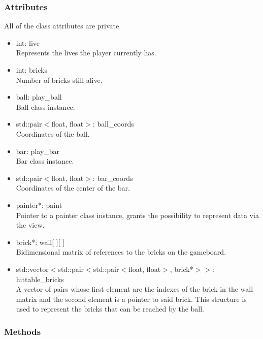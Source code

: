 \documentclass[]{article}
\begin{document}
\subsubsection{Attributes}
All of the class attributes are private
	\begin{itemize}
		\item int: live \\Represents the lives the player currently has.
		\item int: bricks \\Number of bricks still alive.
		\item ball: play\_ball \\Ball class instance.
		\item std::pair$<$float, float$>$: ball\_coords\\Coordinates of the ball.
		\item bar: play\_bar\\Bar class instance.
		\item std::pair$<$float, float$>$: bar\_coords\\Coordinates of the center of the bar.
		\item painter*: paint \\ Pointer to a painter class instance, grants the possibility to represent data via the view.
		\item brick*: wall[ ][ ] \\Bidimensional matrix of references to the bricks on the gameboard.
		\item std::vector$<$std::pair$<$std::pair$<$float, float$>$, brick*$>$$>$: hittable\_bricks \\ A vector of pairs whose first element are the indexes of the brick in the wall matrix and the second element is a pointer to said brick. This structure is used to represent the bricks that can be reached by the ball.
	\end{itemize}

\subsubsection{Methods}
\end{document}
